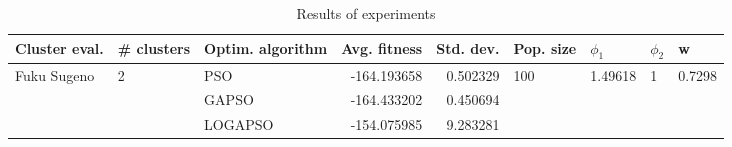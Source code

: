 \begin{table}
\centering
\caption{Results of experiments}
\begin{tabular}{lllrrllll}
\toprule
               Cluster eval. &        \# clusters & Optim. algorithm &  Avg. fitness &  Std. dev. &            Pop. size &               $\phi_{1}$ &         $\phi_{2}$ &                       w \\
\midrule
\multirow{3}{*}{Fuku Sugeno} & \multirow{3}{*}{2} &              PSO &   -164.193658 &   0.502329 & \multirow{3}{*}{100} & \multirow{3}{*}{1.49618} & \multirow{3}{*}{1} & \multirow{3}{*}{0.7298} \\
                             &                    &            GAPSO &   -164.433202 &   0.450694 &                      &                          &                    &                         \\
                             &                    &          LOGAPSO &   -154.075985 &   9.283281 &                      &                          &                    &                         \\
\bottomrule
\end{tabular}
\end{table}
